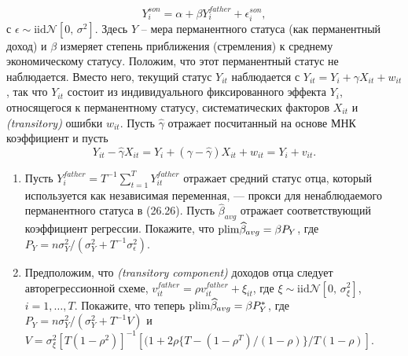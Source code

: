 \begin{enumerate}
\begin{equation}
Y^{son}_i=\alpha + \beta Y^{father}_i + \epsilon^{son}_i,
\end{equation}
с $\epsilon \sim \text{iid} \mathcal{N}[0,\, \sigma^2]$. Здесь $Y$ – мера перманентного статуса (как перманентный доход) и $\beta$ измеряет степень приближения (стремления) к среднему экономическому статусу. Положим, что этот перманентный статус не наблюдается. Вместо него, текущий статус $Y_{it}$ наблюдается с $Y_{it}=Y_i+ \gamma X_{it}+ w_{it}$, так что $Y_{it}$  состоит из индивидуального фиксированного эффекта $Y_{i}$, относящегося к перманентному статусу, систематических факторов $X_{it}$ и \emph{(transitory)} ошибки $w_{it}$. Пусть $\widehat{\gamma}$ отражает посчитанный на основе МНК коэффициент и пусть
\[
Y_{it}-\widehat{\gamma}X_{it}= Y_i+ (\gamma - \widehat{\gamma})X_{it} + w_{it} = Y_i + v_{it}.
\]
\begin{enumerate}
\item Пусть $Y^{father}_i=T^{-1} \sum \limits^{T}_{t=1}Y^{father}_{it}$ отражает средний статус отца, который используется как независимая переменная, --- прокси для ненаблюдаемого перманентного статуса в (26.26). Пусть $\widehat{\beta}_{avg}$ отражает соответствующий коэффициент регрессии. Покажите, что $\mathrm{plim } \widehat{\beta}_{avg}=\beta P_Y$, где $P_Y=n\sigma^2_Y/(\sigma^2_Y+T^{-1} \sigma^2_{\epsilon})$.
\item Предположим, что \emph{(transitory component)} доходов отца следует авторегрессионной схеме, $v^{father}_{it}=\rho v^{father}_{it}+\xi_{it}$, где $\xi \sim \text{iid} \mathcal{N}[0,\, \sigma^2_{\xi}]$, $i=1,\dots ,T$. Покажите, что теперь $\mathrm{plim } \widehat{\beta}_{avg}=\beta P^*_Y$, где $P_Y=n\sigma^2_Y/(\sigma^2_Y+T^{-1} V)$ и $V=\sigma^2_{\xi}[T(1-\rho^2)]^{-1}[(1+2\rho\{ T-(1-\rho^T)/(1-\rho) \} /T(1-\rho)]$.
\end{enumerate}
\end{enumerate} 

